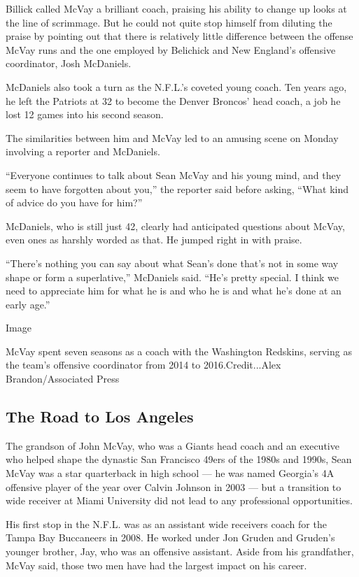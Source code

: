 Billick called McVay a brilliant coach, praising his ability to change
up looks at the line of scrimmage. But he could not quite stop himself
from diluting the praise by pointing out that there is relatively little
difference between the offense McVay runs and the one employed by
Belichick and New England's offensive coordinator, Josh McDaniels.

McDaniels also took a turn as the N.F.L.'s coveted young coach. Ten
years ago, he left the Patriots at 32 to become the Denver Broncos' head
coach, a job he lost 12 games into his second season.

The similarities between him and McVay led to an amusing scene on Monday
involving a reporter and McDaniels.

``Everyone continues to talk about Sean McVay and his young mind, and
they seem to have forgotten about you,'' the reporter said before
asking, ``What kind of advice do you have for him?''

McDaniels, who is still just 42, clearly had anticipated questions about
McVay, even ones as harshly worded as that. He jumped right in with
praise.

``There's nothing you can say about what Sean's done that's not in some
way shape or form a superlative,'' McDaniels said. ``He's pretty
special. I think we need to appreciate him for what he is and who he is
and what he's done at an early age.''

Image

McVay spent seven seasons as a coach with the Washington Redskins,
serving as the team's offensive coordinator from 2014 to
2016.Credit...Alex Brandon/Associated Press

\hypertarget{the-road-to-los-angeles}{%
\subsection{The Road to Los Angeles}\label{the-road-to-los-angeles}}

The grandson of John McVay, who was a Giants head coach and an executive
who helped shape the dynastic San Francisco 49ers of the 1980s and
1990s, Sean McVay was a star quarterback in high school --- he was named
Georgia's 4A offensive player of the year over Calvin Johnson in 2003
--- but a transition to wide receiver at Miami University did not lead
to any professional opportunities.

His first stop in the N.F.L. was as an assistant wide receivers coach
for the Tampa Bay Buccaneers in 2008. He worked under Jon Gruden and
Gruden's younger brother, Jay, who was an offensive assistant. Aside
from his grandfather, McVay said, those two men have had the largest
impact on his career.


